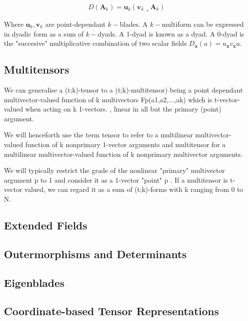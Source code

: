 \documentclass[a4paper]{book}
\numberwithin{equation}{chapter}
\begin{document}
\begin{align*}
    D(\mathbf{A}_k) = \mathbf{u}_k ( \mathbf{v}_k \lrcorner \mathbf{A}_k)
\end{align*}

Where $\mathbf{u}_k, \mathbf{v}_k$ are point-dependant $k-$blades. 
A $k-$multiform can be expressed in dyadic form as a sum of $k-$dyads. 
A 1-dyad is known as a dyad. A 0-dyad is the "succesive" multiplicative 
combination of two scalar fields $D_{\mathbf{x}}(a)=u_{\mathbf{x}}v_{\mathbf{x}} a$.

\subsection{Multitensors}

We can generalise a (t;k)-tensor to a (t;k)-multitensor) being a point dependant multivector-valued function of k multivectors Fp(a1,a2,...,ak) which is t-vector-valued when acting on k 1-vectors. , linear in all but the primary (point) argument.

\vspace{\baselineskip}

We will henceforth use the term tensor to refer to a multilinear multivector-valued function of k nonprimary 1-vector arguments and multitensor for a multilinear multivector-valued function of k nonprimary multivector arguments.

\vspace{\baselineskip}

 We will typically restrict the grade of the nonlinear "primary" multivector argument p to 1 and consider it as a 1-vector "point" p . If a multitensor is t-vector valued, we can regard it as a sum of (t;k)-forms with k ranging from 0 to N. 

\subsection{Extended Fields}
\subsection{Outermorphisms and Determinants}
\subsection{Eigenblades}
\subsection{Coordinate-based Tensor Representations}
\end{document}
